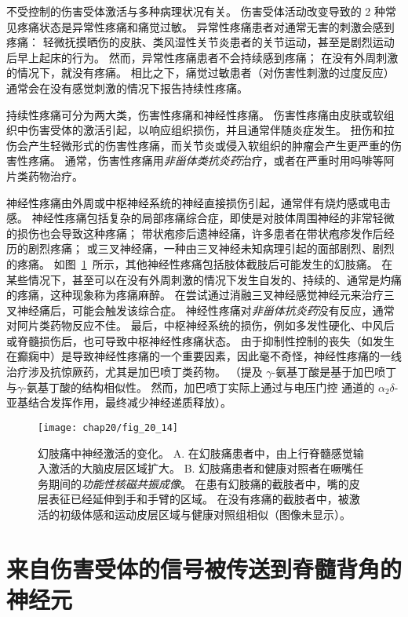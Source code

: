 不受控制的伤害受体激活与多种病理状况有关。
伤害受体活动改变导致的 2 种常见疼痛状态是异常性疼痛和痛觉过敏。
异常性疼痛患者对通常无害的刺激会感到疼痛：
轻微抚摸晒伤的皮肤、类风湿性关节炎患者的关节运动，甚至是剧烈运动后早上起床的行为。
然而，异常性疼痛患者不会持续感到疼痛；
在没有外周刺激的情况下，就没有疼痛。
相比之下，痛觉过敏患者（对伤害性刺激的过度反应）通常会在没有感觉刺激的情况下报告持续性疼痛。


持续性疼痛可分为两大类，伤害性疼痛和神经性疼痛。
伤害性疼痛由皮肤或软组织中伤害受体的激活引起，以响应组织损伤，并且通常伴随炎症发生。
扭伤和拉伤会产生轻微形式的伤害性疼痛，而关节炎或侵入软组织的肿瘤会产生更严重的伤害性疼痛。
通常，伤害性疼痛用\textit{非甾体类抗炎药}治疗，或者在严重时用吗啡等阿片类药物治疗。


神经性疼痛由外周或中枢神经系统的神经直接损伤引起，通常伴有烧灼感或电击感。
神经性疼痛包括复杂的局部疼痛综合症，即使是对肢体周围神经的非常轻微的损伤也会导致这种疼痛；
带状疱疹后遗神经痛，许多患者在带状疱疹发作后经历的剧烈疼痛；
或三叉神经痛，一种由三叉神经未知病理引起的面部剧烈、剧烈的疼痛。
如图~\ref{fig:20_14}~所示，其他神经性疼痛包括肢体截肢后可能发生的幻肢痛。
在某些情况下，甚至可以在没有外周刺激的情况下发生自发的、持续的、通常是灼痛的疼痛，这种现象称为疼痛麻醉。
在尝试通过消融三叉神经感觉神经元来治疗三叉神经痛后，可能会触发该综合症。
神经性疼痛对\textit{非甾体抗炎药}没有反应，通常对阿片类药物反应不佳。
最后，中枢神经系统的损伤，例如多发性硬化、中风后或脊髓损伤后，也可导致中枢神经性疼痛状态。
由于抑制性控制的丧失（如发生在癫痫中）是导致神经性疼痛的一个重要因素，因此毫不奇怪，神经性疼痛的一线治疗涉及抗惊厥药，尤其是加巴喷丁类药物。
（提及 $\gamma$-氨基丁酸是基于加巴喷丁与$\gamma$-氨基丁酸的结构相似性。
然而，加巴喷丁实际上通过与电压门控  通道的 $ \alpha_2\delta $-亚基结合发挥作用，最终减少神经递质释放）。


\begin{figure}[htbp]
	\centering
	\texttt{[image: chap20/fig\_20\_14]}
	\caption{幻肢痛中神经激活的变化。
		A. 在幻肢痛患者中，由上行脊髓感觉输入激活的大脑皮层区域扩大。
		B. 幻肢痛患者和健康对照者在噘嘴任务期间的\textit{功能性核磁共振成像}。
		在患有幻肢痛的截肢者中，嘴的皮层表征已经延伸到手和手臂的区域。
		在没有疼痛的截肢者中，被激活的初级体感和运动皮层区域与健康对照组相似（图像未显示）\cite{flor2006phantom}。}
	\label{fig:20_14}
\end{figure}



\section{来自伤害受体的信号被传送到脊髓背角的神经元}


